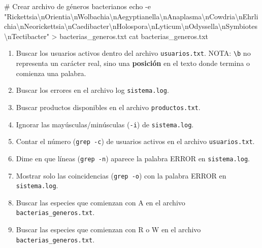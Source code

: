 \documentclass[
  spanish,
  12pt,
  letterpaper,
  DIV=11,
  numbers=noendperiod]{scrreprt}
\newenvironment{Shaded}{\begin{snugshade}}{\end{snugshade}}
\newcommand{\AttributeTok}[1]{\textcolor[rgb]{0.40,0.45,0.13}{#1}}
\newcommand{\BuiltInTok}[1]{\textcolor[rgb]{0.00,0.23,0.31}{#1}}
\newcommand{\CommentTok}[1]{\textcolor[rgb]{0.37,0.37,0.37}{#1}}
\newcommand{\FunctionTok}[1]{\textcolor[rgb]{0.28,0.35,0.67}{#1}}
\newcommand{\NormalTok}[1]{\textcolor[rgb]{0.00,0.23,0.31}{#1}}
\newcommand{\OperatorTok}[1]{\textcolor[rgb]{0.37,0.37,0.37}{#1}}
\newcommand{\StringTok}[1]{\textcolor[rgb]{0.13,0.47,0.30}{#1}}
\begin{document}
\begin{Shaded}
\begin{Highlighting}[]
\CommentTok{\# Crear archivo de géneros bacterianos}
\BuiltInTok{echo} \AttributeTok{{-}e} \StringTok{"Rickettsia\textbackslash{}nOrientia\textbackslash{}nWolbachia\textbackslash{}nAegyptianella\textbackslash{}nAnaplasma\textbackslash{}nCowdria\textbackslash{}nEhrlichia\textbackslash{}nNeorickettsia\textbackslash{}nCaedibacter\textbackslash{}nHolospora\textbackslash{}nLyticum\textbackslash{}nOdyssella\textbackslash{}nSymbiotes\textbackslash{}nTectibacter"} \OperatorTok{\textgreater{}}\NormalTok{ bacterias\_generos.txt}
\FunctionTok{cat}\NormalTok{ bacterias\_generos.txt}
\end{Highlighting}
\end{Shaded}

\begin{enumerate}
\def\labelenumi{\arabic{enumi}.}
\setcounter{enumi}{1}
\item
  Buscar los usuarios activos dentro del archivo \texttt{usuarios.txt}.
  NOTA: \texttt{\textbackslash{}b} no representa un carácter real, sino
  una \textbf{posición} en el texto donde termina o comienza una
  palabra.
\item
  Buscar los errores en el archivo log \texttt{sistema.log}.
\item
  Buscar productos disponibles en el archivo \texttt{productos.txt}.
\item
  Ignorar las mayúsculas/minúsculas (\texttt{-i}) de
  \texttt{sistema.log}.
\item
  Contar el número (\texttt{grep\ -c}) de usuarios activos en el archivo
  \texttt{usuarios.txt}.
\item
  Dime en que líneas (\texttt{grep\ -n}) aparece la palabra ERROR en
  \texttt{sistema.log}.
\item
  Mostrar solo las coincidencias (\texttt{grep\ -o}) con la palabra
  ERROR en \texttt{sistema.log}.
\item
  Buscar las especies que comienzan con A en el archivo
  \texttt{bacterias\_generos.txt}.
\item
  Buscar las especies que comienzan con R o W en el archivo
  \texttt{bacterias\_generos.txt}.

  \begin{tcolorbox}[enhanced jigsaw, arc=.35mm, bottomrule=.15mm, bottomtitle=1mm, breakable, colback=white, colbacktitle=quarto-callout-tip-color!10!white, colframe=quarto-callout-tip-color-frame, coltitle=black, left=2mm, leftrule=.75mm, opacityback=0, opacitybacktitle=0.6, rightrule=.15mm, title={Solución}, titlerule=0mm, toprule=.15mm, toptitle=1mm]


\end{tcolorbox}
\end{enumerate}
\end{document}
